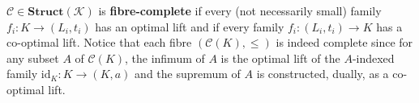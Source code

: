 $\mathcal{C} \in \mathbf{Struct}(\mathcal{K})$ is \textbf{fibre-complete} if every (not necessarily small) family $f_i: K \longrightarrow (L_i, t_i)$ has an optimal lift and if every family $f_i: (L_i, t_i) \longrightarrow K$ has a co-optimal lift. Notice that each fibre $(\mathcal{C}(K), \leqslant)$ is indeed complete since for any subset $A$ of $\mathcal{C}(K)$, the infimum of $A$ is the optimal lift of the $A$-indexed family $\text{id}_K: K \longrightarrow (K, a)$ and the supremum of $A$ is constructed, dually, as a co-optimal lift.
